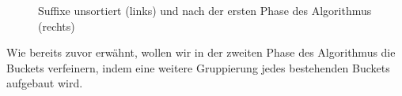 \begin{figure}[ht]
	\caption[Suffixe unsortiert und nach der ersten Phase des Algorithmus]{Suffixe unsortiert (links) und nach der ersten Phase des Algorithmus (rechts)}
	\label{fig:buckets_initial}
\end{figure}
Wie bereits zuvor erwähnt, wollen wir in der zweiten Phase des Algorithmus die Buckets verfeinern, indem eine weitere Gruppierung jedes bestehenden Buckets aufgebaut wird.\par
